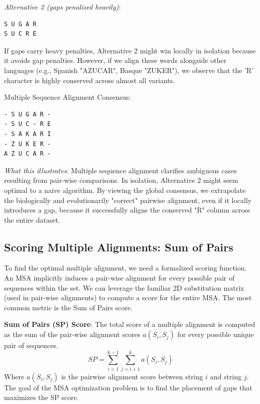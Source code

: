 \textit{Alternative 2 (gaps penalized heavily)}:
\begin{verbatim}
S U G A R
S U C R E
\end{verbatim}

If gaps carry heavy penalties, Alternative 2 might win locally in isolation because it avoids gap penalties. However, if we align these words alongside other languages (e.g., Spanish "AZUCAR", Basque "ZUKER"), we observe that the 'R' character is highly conserved across almost all variants.

Multiple Sequence Alignment Consensus:
\begin{verbatim}
- S U G A R -
- S U C - R E
- S A K A R I
- Z U K E R -
A Z U C A R -
\end{verbatim}
\textit{What this illustrates}: Multiple sequence alignment clarifies ambiguous cases resulting from pair-wise comparisons. In isolation, Alternative 2 might seem optimal to a naive algorithm. By viewing the global consensus, we extrapolate the biologically and evolutionarily "correct" pairwise alignment, even if it locally introduces a gap, because it successfully aligns the conserved "R" column across the entire dataset.


\subsection{Scoring Multiple Alignments: Sum of Pairs}

To find the optimal multiple alignment, we need a formalized scoring function. An MSA implicitly induces a pair-wise alignment for every possible pair of sequences within the set. We can leverage the familiar 2D substitution matrix (used in pair-wise alignments) to compute a score for the entire MSA. The most common metric is the Sum of Pairs score.

\begin{important}
    \textbf{Sum of Pairs (SP) Score}: The total score of a multiple alignment is computed as the sum of the pair-wise alignment scores $a(S_i, S_j)$ for every possible unique pair of sequences.
    \[
    SP = \sum_{i=1}^{k-1} \sum_{j=i+1}^k a(S_i, S_j)
    \]
    Where $a(S_i, S_j)$ is the pairwise alignment score between string $i$ and string $j$.
    The goal of the MSA optimization problem is to find the placement of gaps that maximizes the SP score.
\end{important}


